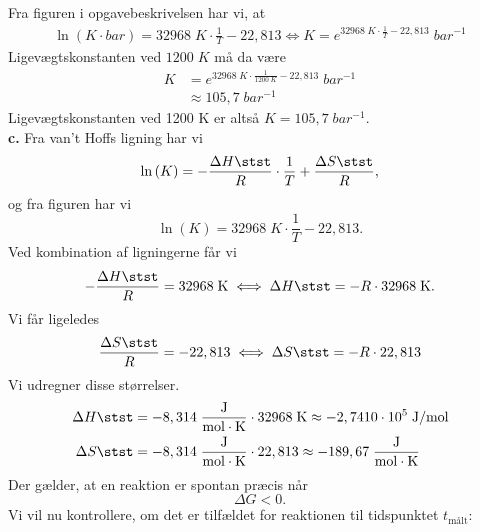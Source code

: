 \documentclass{report}
\begin{document}
\noindent Fra figuren i opgavebeskrivelsen har vi, at 
\begin{equation*}
\begin{split}
  \ln\left(K \cdot \unit{bar} \right) = 32968 \;\unit{K} \cdot \frac{1}{T} -22,813 \iff K=e^{32968 \;\unit{K} \cdot \frac{1}{T} -22,813}\;\unit{bar ^{-1}} 
\end{split}
\end{equation*}
Ligevægtskonstanten ved $1200 \;\unit{K} $ må da være 
\begin{equation*}
\begin{split}
  K&=e^{32968 \;\unit{K} \cdot \frac{1}{1200 \;\unit{K}} -22,813} \;\unit{bar ^{-1}} \\
  &\approx 105,7 \;\unit{bar ^{-1}} 
\end{split}
\end{equation*}
Ligevægtskonstanten ved 1200 K er altså $K=105,7 \;\unit{bar ^{-1}} $.\\[1ex]
\textbf{c.}
Fra van't Hoffs ligning har vi 
\[
\ln\left(K\right) =-\frac{\Delta H \stst }{R} \cdot \frac{1}{T} + \frac{\Delta S \stst }{R},
\] 
og fra figuren har vi 
\[
\ln\left(K \right) = 32968 \;\unit{K} \cdot \frac{1}{T} -22,813.
\] 
Ved kombination af ligningerne får vi 
\begin{equation*}
\begin{split}
  -\frac{\Delta H \stst }{R} = 32968 \;\unit{K} \iff \Delta H \stst = -R \cdot 32968 \;\unit{K}.
\end{split}
\end{equation*}
Vi får ligeledes
\begin{equation*}
\begin{split}
  \frac{\Delta S \stst }{R}= -22,813 \iff \Delta S \stst =-R \cdot 22,813
\end{split}
\end{equation*}
Vi udregner disse størrelser.
\begin{equation*}
\begin{split}
  \Delta H \stst &= -8,314 \;\unit{\frac{J}{mol \cdot K}}  \cdot 32968 \;\unit{K} \approx -2,7410 \cdot 10 ^{5} \;\unit{J/mol} \\
  \Delta S \stst &=-8,314 \;\unit{\frac{J}{mol \cdot K}}  \cdot 22,813 \approx -189,67 \;\unit{\frac{J}{mol \cdot K}} 
\end{split}
\end{equation*}
Der gælder, at en reaktion er spontan præcis når
\[
\Delta G < 0. 
\] 
Vi vil nu kontrollere, om det er tilfældet for reaktionen til tidspunktet $t _{\text{målt} }$:
\end{document}
